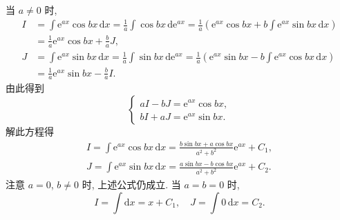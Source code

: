 \begin{solution}[解法 1]
当 $a\neq 0$ 时,
\begin{align*}
I&=\int\mathrm{e}^{ax}\cos bx\,\mathrm{d}x=\frac{1}{a}\int\cos bx\,\mathrm{d}\mathrm{e}^{ax}
=\frac{1}{a}\left(\mathrm{e}^{ax}\cos bx+b\int\mathrm{e}^{ax}\sin bx\,\mathrm{d}x\right)\\
&=\frac{1}{a}\mathrm{e}^{ax}\cos bx+\frac{b}{a}J,\\
J&=\int\mathrm{e}^{ax}\sin bx\,\mathrm{d}x=\frac{1}{a}\int\sin bx\,\mathrm{d}\mathrm{e}^{ax}
=\frac{1}{a}\left(\mathrm{e}^{ax}\sin bx-b\int\mathrm{e}^{ax}\cos bx\,\mathrm{d}x\right)\\
&=\frac{1}{a}\mathrm{e}^{ax}\sin bx-\frac{b}{a}I.
\end{align*}
由此得到
\[
\begin{cases}
aI-bJ=\mathrm{e}^{ax}\cos bx,\\
bI+aJ=\mathrm{e}^{ax}\sin bx.
\end{cases}
\]
解此方程得
\begin{gather*}
I=\int\mathrm{e}^{ax}\cos bx\,\mathrm{d}x=\frac{b\sin bx+a\cos bx}{a^{2}+b^{2}}\mathrm{e}^{ax}+C_{1},\\
J=\int\mathrm{e}^{ax}\sin bx\,\mathrm{d}x=\frac{a\sin bx-b\cos bx}{a^{2}+b^{2}}\mathrm{e}^{ax}+C_{2}.
\end{gather*}
注意 $a=0$, $b\neq 0$ 时, 上述公式仍成立. 当 $a=b=0$ 时,
\[
I=\int\mathrm{d}x=x+C_{1},\quad J=\int 0\,\mathrm{d}x=C_{2}.
\]
\end{solution}


